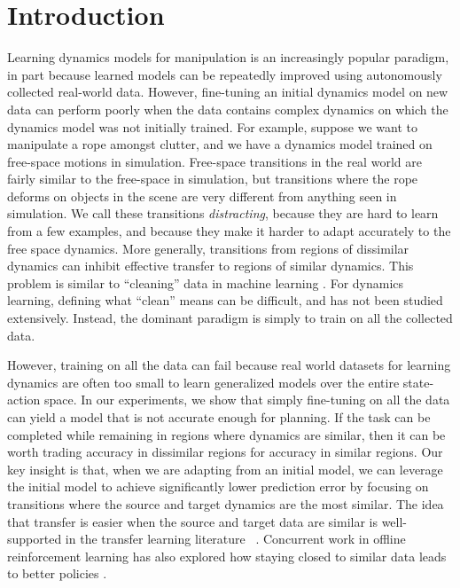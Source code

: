 \section{Introduction} \label{ICRA:sec:intro}

 Learning dynamics models for manipulation is an increasingly popular paradigm, in part because learned models can be repeatedly improved using autonomously collected real-world data. However, fine-tuning an initial dynamics model on new data can perform poorly when the data contains complex dynamics on which the dynamics model was not initially trained. For example, suppose we want to manipulate a rope amongst clutter, and we have a dynamics model trained on free-space motions in simulation. Free-space transitions in the real world are fairly similar to the free-space in simulation, but transitions where the rope deforms on objects in the scene are very different from anything seen in simulation. We call these transitions \emph{distracting}, because they are hard to learn from a few examples, and because they make it harder to adapt accurately to the free space dynamics. More generally, transitions from regions of dissimilar dynamics can inhibit effective transfer to regions of similar dynamics. This problem is similar to ``cleaning'' data in machine learning \cite{mislabeled99,filtering21,anomoly22}. For dynamics learning, defining what ``clean'' means can be difficult, and has not been studied extensively. Instead, the dominant paradigm is simply to train on all the collected data.

However, training on all the data can fail because real world datasets for learning dynamics are often too small to learn generalized models over the entire state-action space. In our experiments, we show that simply fine-tuning on all the data can yield a model that is not accurate enough for planning. If the task can be completed while remaining in regions where dynamics are similar, then it can be worth trading accuracy in dissimilar regions for accuracy in similar regions.
Our key insight is that, when we are adapting from an initial model, we can leverage the initial model to achieve significantly lower prediction error by focusing on transitions where the source and target dynamics are the most similar. The idea that transfer is easier when the source and target data are similar is well-supported in the transfer learning literature ~\cite{sorocky2020experience,bocsi2013alignment}. Concurrent work in offline reinforcement learning has also explored how staying closed to similar data leads to better policies \cite{vuong2022dasco}.

